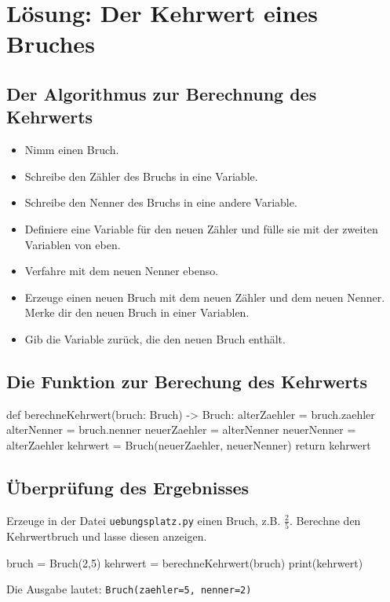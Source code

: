 \section{Lösung: Der Kehrwert eines Bruches}

\subsection*{Der Algorithmus zur Berechnung des Kehrwerts}

\begin{itemize}
	\item Nimm einen Bruch.
	\item Schreibe den Zähler des Bruchs in eine Variable.
	\item Schreibe den Nenner des Bruchs in eine andere Variable.
	\item Definiere eine Variable für den neuen Zähler und fülle sie mit der zweiten Variablen von eben.
	\item Verfahre mit dem neuen Nenner ebenso.
	\item Erzeuge einen neuen Bruch mit dem neuen Zähler und dem neuen Nenner. Merke dir den neuen Bruch in einer Variablen.
	\item Gib die Variable zurück, die den neuen Bruch enthält.
\end{itemize}

\subsection*{Die Funktion zur Berechung des Kehrwerts}

\begin{codePython}
def berechneKehrwert(bruch: Bruch) -> Bruch:
	alterZaehler = bruch.zaehler
	alterNenner = bruch.nenner
	neuerZaehler = alterNenner
	neuerNenner = alterZaehler
	kehrwert = Bruch(neuerZaehler, neuerNenner)
	return kehrwert
\end{codePython}

\subsection*{Überprüfung des Ergebnisses}

Erzeuge in der Datei \texttt{uebungsplatz.py} einen Bruch, z.B. $\frac{2}{5}$. Berechne den Kehrwertbruch und lasse diesen anzeigen.

\begin{codePython}
bruch = Bruch(2,5)
kehrwert = berechneKehrwert(bruch)
print(kehrwert)
\end{codePython}

Die Ausgabe lautet: \texttt{Bruch(zaehler=5, nenner=2)}
